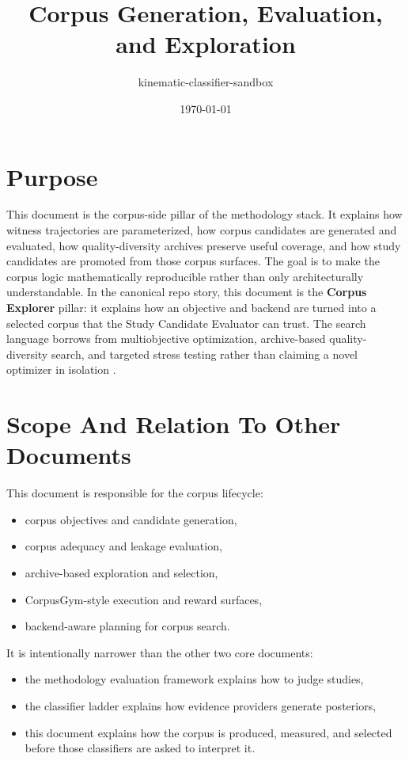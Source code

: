 \documentclass[11pt]{article}
\title{Corpus Generation, Evaluation, and Exploration}
\author{kinematic-classifier-sandbox}
\date{\today}
\begin{document}
\maketitle

\section{Purpose}

This document is the corpus-side pillar of the methodology stack. It explains
how witness trajectories are parameterized, how corpus candidates are generated
and evaluated, how quality-diversity archives preserve useful coverage, and how
study candidates are promoted from those corpus surfaces. The goal is to make
the corpus logic mathematically reproducible rather than only architecturally
understandable. In the canonical repo story, this document is the
\textbf{Corpus Explorer} pillar: it explains how an objective and backend are
turned into a selected corpus that the Study Candidate Evaluator can trust. The
search language borrows from multiobjective optimization, archive-based
quality-diversity search, and targeted stress testing rather than claiming a
novel optimizer in isolation \cite{deb2002,mouret2015,corso2022}.

\section{Scope And Relation To Other Documents}

This document is responsible for the corpus lifecycle:
\begin{itemize}[leftmargin=1.5em]
    \item corpus objectives and candidate generation,
    \item corpus adequacy and leakage evaluation,
    \item archive-based exploration and selection,
    \item CorpusGym-style execution and reward surfaces,
    \item backend-aware planning for corpus search.
\end{itemize}

It is intentionally narrower than the other two core documents:
\begin{itemize}[leftmargin=1.5em]
    \item the methodology evaluation framework explains how to judge studies,
    \item the classifier ladder explains how evidence providers generate
    posteriors,
    \item this document explains how the corpus is produced, measured, and
    selected before those classifiers are asked to interpret it.
\end{itemize}
\end{document}

